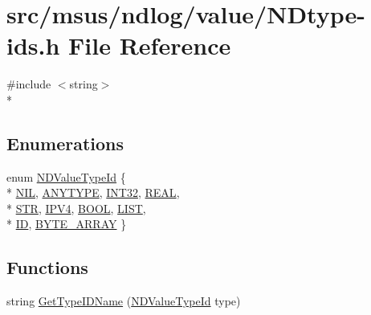 \hypertarget{_n_dtype-ids_8h}{\section{src/msus/ndlog/value/\-N\-Dtype-\/ids.h File Reference}
\label{_n_dtype-ids_8h}
}
{\ttfamily \#include $<$string$>$}\\*
\subsection*{Enumerations}
\begin{DoxyCompactItemize}
\item 
enum \hyperlink{_n_dtype-ids_8h_af55089c57d3c2d854f6f5aebc517e484}{N\-D\-Value\-Type\-Id} \{ \\*
\hyperlink{_n_dtype-ids_8h_af55089c57d3c2d854f6f5aebc517e484a682466b7669a81b39a8d657274fd4b95}{N\-I\-L}, 
\hyperlink{_n_dtype-ids_8h_af55089c57d3c2d854f6f5aebc517e484a92532b93c535d32fb6ea6a00c7700e41}{A\-N\-Y\-T\-Y\-P\-E}, 
\hyperlink{_n_dtype-ids_8h_af55089c57d3c2d854f6f5aebc517e484ac1081c62db14e24ef35a1c3c36cba2e7}{I\-N\-T32}, 
\hyperlink{_n_dtype-ids_8h_af55089c57d3c2d854f6f5aebc517e484a053cb139f4b2333482449705c529b1e9}{R\-E\-A\-L}, 
\\*
\hyperlink{_n_dtype-ids_8h_af55089c57d3c2d854f6f5aebc517e484aec41e801b43cfbec49d343c900360bf9}{S\-T\-R}, 
\hyperlink{_n_dtype-ids_8h_af55089c57d3c2d854f6f5aebc517e484acfc4c1053c60b6cc2a7776c60969f31f}{I\-P\-V4}, 
\hyperlink{_n_dtype-ids_8h_af55089c57d3c2d854f6f5aebc517e484ae663dbb8f8244e122acb5bd6b2c216e1}{B\-O\-O\-L}, 
\hyperlink{_n_dtype-ids_8h_af55089c57d3c2d854f6f5aebc517e484a25688e799536738ea469158ef15fd1c0}{L\-I\-S\-T}, 
\\*
\hyperlink{_n_dtype-ids_8h_af55089c57d3c2d854f6f5aebc517e484a001479a58fb44c39a29b20d565081a68}{I\-D}, 
\hyperlink{_n_dtype-ids_8h_af55089c57d3c2d854f6f5aebc517e484aace3bec7e8052c1c70af9f9440546258}{B\-Y\-T\-E\-\_\-\-A\-R\-R\-A\-Y}
 \}
\end{DoxyCompactItemize}
\subsection*{Functions}
\begin{DoxyCompactItemize}
\item 
string \hyperlink{_n_dtype-ids_8h_a8726cae6ee3f6ac73fbb747c5e1b0aae}{Get\-Type\-I\-D\-Name} (\hyperlink{_n_dtype-ids_8h_af55089c57d3c2d854f6f5aebc517e484}{N\-D\-Value\-Type\-Id} type)
\end{DoxyCompactItemize}


